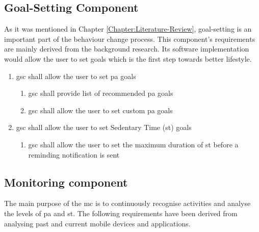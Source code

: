     \subsection{Goal-Setting Component}
    As it was mentioned in Chapter \ref{Chapter:Literature-Review},  goal-setting is an important part of the behaviour change process. This component's requirements are mainly derived from the background research. Its software implementation would allow the user to set goals which is the first step towards better lifestyle.
    
    \begin{enumerate}
        \item \gls{gsc} shall allow the user to set \gls{pa} goals
        \begin{enumerate}
            \item \gls{gsc} shall provide list of recommended \gls{pa} goals
            \item \gls{gsc} shall allow the user to set custom \gls{pa} goals
        \end{enumerate}
        \item \gls{gsc} shall allow the user to set Sedentary Time (\gls{st}) goals
        \begin{enumerate}
            \item \gls{gsc} shall allow the user to set the maximum duration of \gls{st} before a reminding notification is sent 
        \end{enumerate}
    \end{enumerate}
    
    
    \subsection{Monitoring component}
    The main purpose of the \gls{mc} is to continuously recognise activities and analyse the levels of \gls{pa} and \gls{st}. The following requirements have been derived from analysing past and current mobile devices and applications.
    
